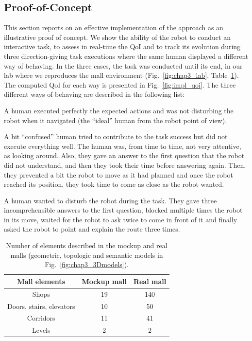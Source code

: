 \documentclass[a4paper,11pt,twoside]{StyleThese}
\begin{document}
\subsection{Proof-of-Concept}\label{subsec:results}
This section reports on an effective implementation of the approach as an illustrative proof of concept. We show the ability of the robot to conduct an interactive task, to assess in real-time the QoI and to track its evolution during three direction-giving task executions where the same human displayed a different way of behaving. In the three cases, the task was conducted until its end, in our lab where we reproduces the mall environment (Fig.~\ref{fig:chap3_lab}, Table~\ref{tab:malls}). The computed QoI for each way is presented in Fig.~\ref{fig:impl_qoi}. The three different ways of behaving are described in the following list:
\begin{bulletList}
	\item A human executed perfectly the expected actions and was not disturbing the robot when it navigated (\ie the ``ideal'' human from the robot point of view). 
	\item A bit ``confused'' human tried to contribute to the task success but did not execute everything well. The human was, from time to time, not very attentive, as looking around. Also, they gave an answer to the first question that the robot did not understand, and then they took their time before answering again. Then, they prevented a bit the robot to move as it had planned and once the robot reached its position, they took time to come as close as the robot wanted. 
	\item A human wanted to disturb the robot during the task. They gave three incomprehensible answers to the first question, blocked multiple times the robot in its move, waited for the robot to ask twice to come in front of it and finally asked the robot to point and explain the route three times. 
\end{bulletList}

\begin{table}[!h]
	\begin{center}
		\begin{tabular}{ | c || c | c | }
			\hline
			Mall elements                   & Mockup mall & Real mall \\ \hline \hline
			Shops              & 19            & 140   \\ \hline
			Doors, stairs, elevators & 10            & 50    \\ \hline
			Corridors              & 11            & 41    \\ \hline
			Levels   & 2            & 2   \\ 
			\hline
		\end{tabular}
	\end{center}
	\caption{\label{tab:malls} Number of elements described in the mockup and real malls (geometric, topologic and semantic models in Fig.~\ref{fig:chap3_3Dmodels}).}
\end{table}
\end{document}
